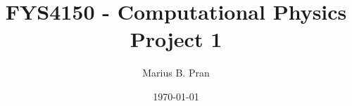 \documentclass[12pt, a4paper]{article}
\begin{document}
\title{FYS4150 - Computational Physics\\Project 1}
\author{Marius B. Pran}
\date{\today}
\maketitle

\subsection{}
\end{document}
